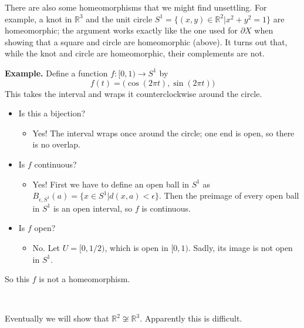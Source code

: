 \documentclass[11pt]{amsart}
\newcommand{\ex}{ {\bf Example.} }
\newcommand{\R}{\mathbb R}
\begin{document}
There are also some homeomorphisms that we might find unsettling.  For example, a knot in $\R^3$ and the unit circle $S^1 = \{ (x,y)\in\R^2 | x^2+y^2 = 1\}$ are homeomorphic; the argument works exactly like the one used for $\partial X$ when showing that a square and circle are homeomorphic (above).  It turns out that, while the knot and circle are homeomorphic, their complements are not.

\pagebreak
\ex Define a function $f:[0,1)\to S^1$ by
\[ f(t) = \big( \cos(2\pi t), \sin(2\pi t)\big) \]
This takes the interval and wraps it counterclockwise around the circle.
\begin{itemize}
\item Is this a bijection?
\begin{itemize}
\item Yes!  The interval wraps once around the circle; one end is open, so there is no overlap.
\end{itemize}

\item Is $f$ continuous?
\begin{itemize}
\item Yes!  First we have to define an open ball in $S^1$ as $B_{\epsilon, S^1}(a) = \{x\in S^1 | d(x,a) < \epsilon\}$.  Then the preimage of every open ball in $S^1$ is an open interval, so $f$ is continuous.  
\end{itemize}


\item Is $f$ open?
\begin{itemize}
\item No.  Let $U = [0, 1/2)$, which is open in $[0,1)$.  Sadly, its image is not open in $S^1$.
\end{itemize}

\end{itemize}
So this $f$ is not a homeomorphism.

\mbox{ }

Eventually we will show that $\R^2 \not\cong \R^3$.  Apparently this is difficult.
\end{document}
